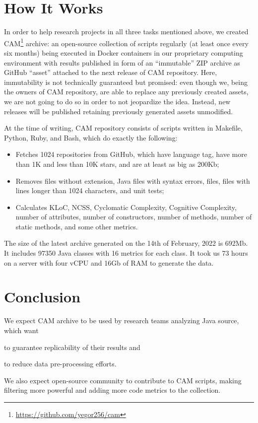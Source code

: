 \documentclass[sigplan,nonacm,natbib=false]{acmart}
\begin{document}
\section*{How It Works}

In order to help research projects in all three tasks mentioned above, we created CAM\footnote{\url{https://github.com/yegor256/cam}} archive: an open-source collection of scripts regularly (at least once every six months) being executed in Docker containers in our proprietary computing environment with results published in form of an ``immutable'' ZIP archive as GitHub ``asset'' attached to the next release of CAM repository. Here, immutability is not technically guaranteed but promised: even though we, being the owners of CAM repository, are able to replace any previously created assets, we are not going to do so in order to not jeopardize the idea. Instead, new releases will be published retaining previously generated assets unmodified.

At the time of writing, CAM repository consists of scripts written in Makefile, Python, Ruby, and Bash, which do exactly the following:

\begin{itemize}
    \item Fetches 1024 repositories from GitHub, which have  language tag, have more than 1K and less than 10K stars, and are at least as big as 200Kb;
    \item Removes files without  extension, Java files with syntax errors,  files, files with lines longer than 1024 characters, and unit tests;
    \item Calculates KLoC, NCSS, Cyclomatic Complexity, Cognitive Complexity, number of attributes, number of constructors, number of methods, number of static methods, and some other metrics.
\end{itemize}

The size of the latest archive generated on the 14th of February, 2022 is 692Mb. It includes 97350 Java classes with 16 metrics for each class. It took us 73 hours on a server with four vCPU and 16Gb of RAM to generate the data.

\section*{Conclusion}

We expect CAM archive to be used by research teams analyzing Java source, which want
\begin{inparaenum}[(a)]
\item to guarantee replicability of their results
and
\item to reduce data pre-processing efforts.
\end{inparaenum}
We also expect open-source community to contribute to CAM scripts, making filtering more powerful and adding more code metrics to the collection.

\printbibliography
\end{document}
